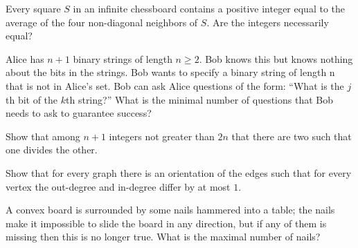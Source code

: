 \documentclass[10pt]{mypackage}
\begin{document}
\RaggedRight
\begin{problem}[Problem 1]
  Every square $S$ in an infinite chessboard contains a positive integer equal to the average of the four non-diagonal neighbors of $S$. Are the integers necessarily equal?
\end{problem}
\begin{problem}[Problem 2]
  Alice has $n+1$ binary strings of length $n\geq 2$. Bob knows this but knows nothing about the bits in the strings. Bob wants to specify a binary string of length n that is not in Alice’s set. Bob can ask Alice questions of the form: ``What is the $j$th bit of the $k$th string?'' What is the minimal number of questions that Bob needs to ask to guarantee success?
\end{problem}
\begin{problem}[Problem 3]
  Show that among $n+1$ integers not greater than $2n$ that there are two such that one divides the other.
\end{problem}
\begin{problem}[Problem 4]
Show that for every graph there is an orientation of the edges such that for every vertex the out-degree and in-degree differ by at most $1$.
\end{problem}
\begin{problem}[Problem 5]
A convex board is surrounded by some nails hammered into a table; the nails make it impossible to slide the board in any direction, but if any of them is missing then this is no longer true. What is the maximal number of nails?
\end{problem}
\end{document}
